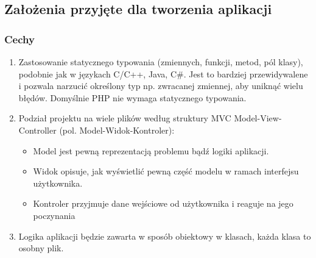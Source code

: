 \pagebreak

\subsection{Założenia przyjęte dla tworzenia aplikacji}

\subsubsection{Cechy}
\begin{enumerate}
    \item Zastosowanie statycznego typowania (zmiennych, funkcji, metod, pól klasy), podobnie jak w językach C/C++, Java, C\#. Jest to bardziej przewidywalene i pozwala narzucić określony typ np. zwracanej zmiennej, aby uniknąć wielu błędów. Domyślnie PHP nie wymaga statycznego typowania.
    \item Podział projektu na wiele plików według struktury MVC Model-View-Controller (pol. Model-Widok-Kontroler):
        \begin{itemize}
            \item Model jest pewną reprezentacją problemu bądź logiki aplikacji.
            \item Widok opisuje, jak wyświetlić pewną część modelu w ramach interfejsu użytkownika. 
            \item Kontroler przyjmuje dane wejściowe od użytkownika i reaguje na jego poczynania
        \end{itemize}
    \item Logika aplikacji będzie zawarta w sposób obiektowy w klasach, każda klasa to osobny  plik.
\end{enumerate}

